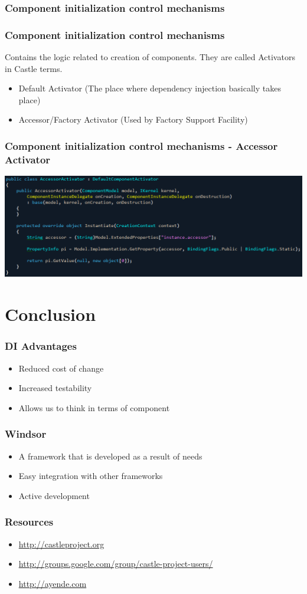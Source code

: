 \documentclass[turkish]{beamer}
\begin{document}
			\subsubsection{Component initialization control mechanisms}
			  \frame
				{
					\frametitle{Component initialization control mechanisms}
					Contains the logic related to creation of components. They are called Activators in Castle terms.
			  	\begin{itemize}
			  		\item<1->Default Activator (The place where dependency injection basically takes place)
			  		\item<2->Accessor/Factory Activator (Used by Factory Support Facility)
			  	\end{itemize}
			 }
			 	\frame
				{
					\frametitle{Component initialization control mechanisms - Accessor Activator}
					\begin{center}
							\includegraphics[scale=0.40]{images/accessoractivator.png}
					\end{center}
			  }
	\section{Conclusion}
		 \frame
		 {
		  	\frametitle{DI Advantages}
				\begin{itemize}
					\item<1->Reduced cost of change
			  	\item<2->Increased testability
			  	\item<3->Allows us to think in terms of component
			  \end{itemize}
			}
			\frame
		 {
		  	\frametitle{Windsor}
				\begin{itemize}
					\item<1->A framework that is developed as a result of needs
			  	\item<2->Easy integration with other frameworks
			  	\item<3->Active development
			  \end{itemize}
			}
			\frame
		 {
		  	\frametitle{Resources}
				\begin{itemize}
					\item<1->\href{http://castleproject.org}{http://castleproject.org}
					\item<2->\href{http://groups.google.com/group/castle-project-users/}{http://groups.google.com/group/castle-project-users/}
			  	\item<3->\href{http://ayende.com}{http://ayende.com}
			  \end{itemize}
			}
\end{document}
